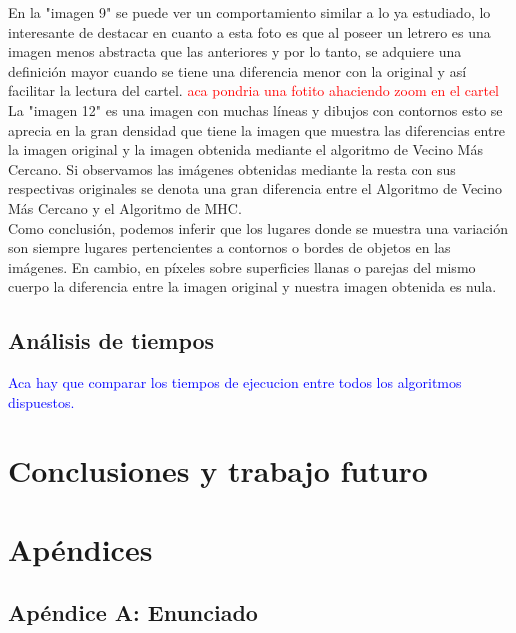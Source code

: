 \documentclass[a4paper]{article}
\begin{document}
En la "imagen 9" se puede ver un comportamiento similar a lo ya estudiado, lo interesante de destacar en cuanto a esta foto es que al poseer un letrero es una imagen menos abstracta que las anteriores y por lo tanto, se adquiere una definici\'on mayor cuando se tiene una diferencia menor con la original y as\'i facilitar la lectura del cartel.
\textcolor{red}{aca pondria una fotito ahaciendo zoom en el cartel}\\

La "imagen 12" es una imagen con muchas l\'ineas y dibujos con contornos esto se aprecia en la gran densidad que tiene la imagen que muestra las diferencias entre la imagen original y la imagen obtenida mediante el algoritmo de Vecino M\'as Cercano. Si observamos las im\'agenes obtenidas mediante la resta con sus respectivas originales se denota una gran diferencia entre el Algoritmo de Vecino M\'as Cercano y el Algoritmo de MHC.\\

Como conclusi\'on, podemos inferir que los lugares donde se muestra una variaci\'on son siempre lugares pertencientes a contornos o bordes de objetos en las im\'agenes. En cambio, en p\'ixeles sobre superficies llanas o parejas del mismo cuerpo la diferencia entre la imagen original y nuestra imagen obtenida es nula.


\subsection{An\'alisis de tiempos}
\textcolor{blue}{Aca hay que comparar los tiempos de ejecucion entre todos los algoritmos dispuestos.}

\newpage
\section{Conclusiones y trabajo futuro}





\section{Ap\'endices}
\subsection{Ap\'endice A: Enunciado} 


%
\end{document}
